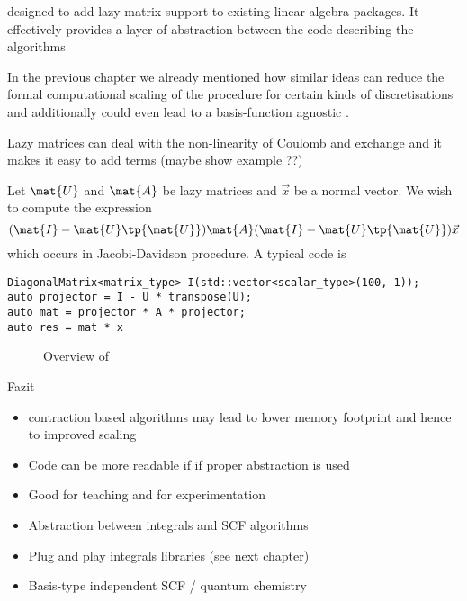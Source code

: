 designed to add lazy matrix support to existing
linear algebra packages.
It effectively provides a layer of abstraction between the code
describing the algorithms


In the previous chapter we already mentioned
how similar ideas can reduce the formal
computational scaling of the \SCF procedure
for certain kinds of discretisations
and additionally could even lead to a basis-function
agnostic \SCF.


Lazy matrices can deal with the non-linearity of Coulomb and exchange
and it makes it easy to add terms (maybe show example ??)

Let $\mat{U}$ and $\mat{A}$ be lazy matrices and $\vec{x}$ be a normal vector.
We wish to compute the expression
\[ (\mat{I} - \mat{U} \tp{\mat{U}}) \mat{A} (\mat{I} - \mat{U} \tp{\mat{U}}) \vec{x} \]
which occurs in Jacobi-Davidson procedure.
A typical code is
\begin{lstlisting}
DiagonalMatrix<matrix_type> I(std::vector<scalar_type>(100, 1));
auto projector = I - U * transpose(U);
auto mat = projector * A * projector;
auto res = mat * x
\end{lstlisting}







\begin{figure}
	\centering
	\caption{Overview of \lazyten}
	\label{fig:structureLazyten}
\end{figure}




Fazit
\begin{itemize}
	\item contraction based algorithms may lead to lower memory footprint and
		hence to improved scaling
	\item Code can be more readable if if proper abstraction is used
	\item Good for teaching and for experimentation
	\item Abstraction between integrals and SCF algorithms
	\item Plug and play integrals libraries (see next chapter)
	\item Basis-type independent SCF / quantum chemistry
\end{itemize}





